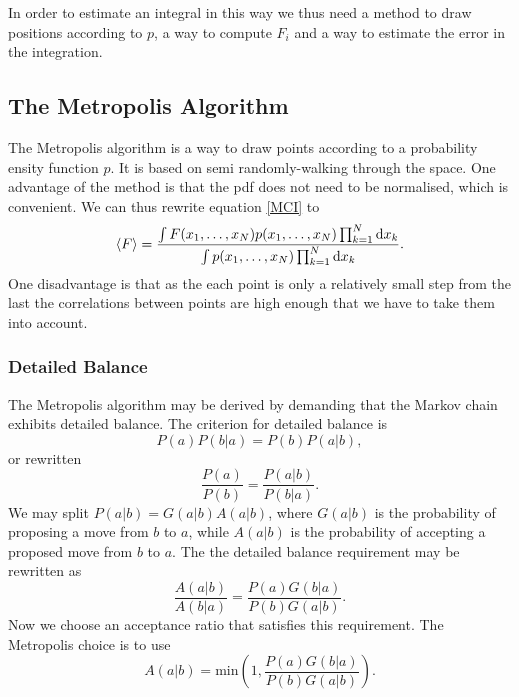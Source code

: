 \documentclass[a4paper,English,10pt]{article}
\newcommand{\dd}{\mathrm{d}}
\newcommand{\be}{\begin{equation}}
\newcommand{\ee}{\end{equation}}
\newcommand{\f}{\frac}
\renewcommand{\braket}{\Braket}
\begin{document}
In order to estimate an integral in this way we thus need a method to draw positions according to $p$,
a way to compute $F_i$ and a way to estimate the error in the integration.





\subsection{The Metropolis Algorithm}

The Metropolis algorithm is a way to draw points according to a probability ensity function $p$. It is based on semi randomly-walking through
the space. One advantage of the method is that the pdf does not need to be normalised, which is convenient.
We can thus rewrite equation \ref{MCI} to
\be
\braket{F} = \f{\int F(x_1,\ldots,x_N)p(x_1,\ldots,x_N)\prod_{k=1}^N\dd x_k}{\int p(x_1,\ldots,x_N)\prod_{k=1}^N\dd x_k}. \label{exp}
\ee
One disadvantage is that
as the each point is only a relatively small step from the last the correlations between points are high enough that we have to take them into account.


\subsubsection{Detailed Balance}
The Metropolis algorithm may be derived by demanding that the Markov chain exhibits detailed balance.
The criterion for detailed balance is
\be
P(a)P(b|a) = P(b)P(a|b),
\ee
or rewritten
\be
\f{P(a)}{P(b)} = \f{P(a|b)}{P(b|a)}.
\ee
We may split \(P(a|b) = G(a|b)A(a|b)\), where \(G(a|b)\) is the probability of proposing a move from $b$ to $a$, while
$A(a|b)$ is the probability of accepting a proposed move from $b$ to $a$. The the detailed balance requirement may be rewritten as
\be
\f{A(a|b)}{A(b|a)} = \f{P(a)G(b|a)}{P(b)G(a|b)}.
\ee
Now we choose an acceptance ratio that satisfies this requirement. The Metropolis choice is to use
\be
A(a|b) = \mathrm{min}\left(1,\f{P(a)G(b|a)}{P(b)G(a|b)}\right).\label{arat}
\ee
\end{document}
